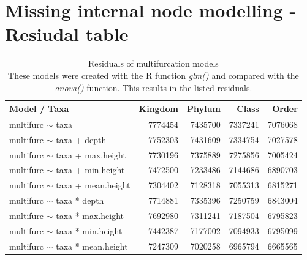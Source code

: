   \section{Missing internal node modelling - Resiudal table} %
    \begin{table}[h!]
      \begin{center}
          \begin{tabular}{ |l|r|r|r|r| }
            \hline
            \bfseries Model / Taxa & \bfseries Kingdom & \bfseries Phylum & \bfseries Class & \bfseries Order \\
            \hline \hline
            multifurc $\sim$ taxa & 7774454 & \cellcolor{green!10}7435700 & \cellcolor{green!15}7337241 & \cellcolor{green!30}7076068 \\
            \hline
            multifurc $\sim$ taxa + depth & 7752303 & \cellcolor{green!10}7431609 & \cellcolor{green!15}7334754 & \cellcolor{green!30}7027578 \\
            multifurc $\sim$ taxa + max.height & 7730196 & \cellcolor{green!15}7375889 & \cellcolor{green!20}7275856 & \cellcolor{green!30}7005424 \\
            multifurc $\sim$ taxa + min.height & \cellcolor{green!10}7472500 & \cellcolor{green!20}7233486 & \cellcolor{green!25}7144686 & \cellcolor{green!40}6890703 \\
            multifurc $\sim$ taxa + mean.height & \cellcolor{green!15}7304402 & \cellcolor{green!25}7128318 & \cellcolor{green!30}7055313 & \cellcolor{green!40}6815271 \\
            \hline
            multifurc $\sim$ taxa * depth & 7714881 & \cellcolor{green!15}7335396 & \cellcolor{green!20}7250759 & \cellcolor{green!40}6843004 \\
            multifurc $\sim$ taxa * max.height & \cellcolor{green!5}7692980 & \cellcolor{green!15}7311241 & \cellcolor{green!25}7187504 & \cellcolor{green!45}6795823 \\
            multifurc $\sim$ taxa * min.height & \cellcolor{green!10}7442387 & \cellcolor{green!25}7177002 & \cellcolor{green!30}7094933 & \cellcolor{green!45}6795099 \\
            multifurc $\sim$ taxa * mean.height & \cellcolor{green!20}7247309 & \cellcolor{green!30}7020258 & \cellcolor{green!35}6965794 & \cellcolor{green!50}6665565 \\
            \hline
          \end{tabular}
      \end{center}
      \caption{Residuals of multifurcation models \\
        These models were created with the R function \textit{glm()} and compared with the 
          \textit{anova()} function. This results in the listed residuals.}
      \label{table:Residuals multifurcation} 
    \end{table}

